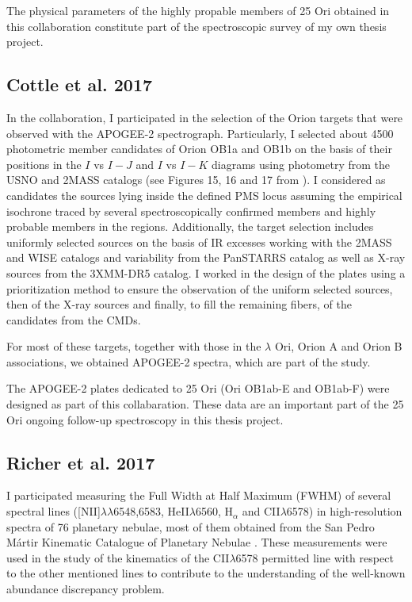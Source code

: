 \documentclass[12pt]{article}
\begin{document}
The physical parameters of the highly propable members of 25 Ori obtained in this collaboration constitute part of the spectroscopic survey of my own thesis project.

\subsection{Cottle et al. 2017}
\label{sec:Cottle}
In the \citet{Cottle2018} collaboration, I participated in the selection of the Orion targets that were observed with the APOGEE-2 spectrograph. Particularly, I selected about 4500 photometric member candidates of Orion OB1a and OB1b on the basis of their positions in the $I$ vs $I-J$ and $I$ vs $I-K$ diagrams using photometry from the USNO and 2MASS catalogs (see Figures 15, 16 and 17 from \citealt{Cottle2018}). I considered as candidates the sources lying inside the defined PMS locus assuming the empirical isochrone traced by several spectroscopically confirmed members and highly probable members in the regions. Additionally, the target selection includes uniformly selected sources on the basis of IR excesses working with the 2MASS and WISE catalogs and variability from the PanSTARRS catalog as well as X-ray sources from the 3XMM-DR5 catalog. I worked in the design of the plates using a prioritization method to ensure the observation of the uniform selected sources, then of the X-ray sources and finally, to fill the remaining fibers, of the candidates from the CMDs.

For most of these targets, together with those in the $\lambda$ Ori, Orion A and Orion B associations, we obtained APOGEE-2 spectra, which are part of the \citet{Kounkel2018} study. 

The APOGEE-2 plates dedicated to 25 Ori (Ori OB1ab-E and OB1ab-F) were designed as part of this collabaration. These data are an important part of the 25 Ori ongoing follow-up spectroscopy in this thesis project.

\subsection{Richer et al. 2017}
\label{sec:Richer}
I participated measuring the Full Width at Half Maximum (FWHM) of several spectral lines ([NII]$\lambda\lambda$6548,6583, HeII$\lambda$6560, H$_\alpha$ and CII$\lambda$6578) in high-resolution spectra of 76 planetary nebulae, most of them obtained from the San Pedro M\'artir Kinematic Catalogue of Planetary Nebulae \citep{Lopez2012}. These measurements were used in the \citet{Richer2017} study of the kinematics of the CII$\lambda$6578 permitted line with respect to the other mentioned lines to contribute to the understanding of the well-known abundance discrepancy problem.
\end{document}
